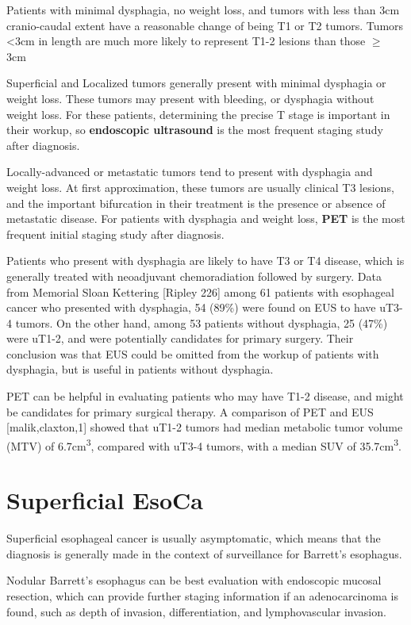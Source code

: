 \documentclass[
]{book}
\begin{document}
Patients with minimal dysphagia, no weight loss, and tumors with less than 3cm cranio-caudal extent have a reasonable change of being T1 or T2 tumors. Tumors \textless3cm in length are much more likely to represent T1-2 lesions than those \(\geq\) 3cm\citep{hollis1114}

Superficial and Localized tumors generally present with minimal dysphagia or weight loss. These tumors may present with bleeding, or dysphagia without weight loss. For these patients, determining the precise T stage is important in their workup, so \textbf{endoscopic ultrasound} is the most frequent staging study after diagnosis.

Locally-advanced or metastatic tumors tend to present with dysphagia and weight loss. At first approximation, these tumors are usually clinical T3 lesions, and the important bifurcation in their treatment is the presence or absence of metastatic disease. For patients with dysphagia and weight loss, \textbf{PET} is the most frequent initial staging study after diagnosis.

Patients who present with dysphagia are likely to have T3 or T4 disease, which is generally treated with neoadjuvant chemoradiation followed by surgery. Data from Memorial Sloan Kettering {[}Ripley 226{]} among 61 patients with esophageal cancer who presented with dysphagia, 54 (89\%) were found on EUS to have uT3-4 tumors. On the other hand, among 53 patients without dysphagia, 25 (47\%) were uT1-2, and were potentially candidates for primary surgery. Their conclusion was that EUS could be omitted from the workup of patients with dysphagia, but is useful in patients without dysphagia.

PET can be helpful in evaluating patients who may have T1-2 disease, and might be candidates for primary surgical therapy. A comparison of PET and EUS {[}malik,claxton,1{]} showed that uT1-2 tumors had median metabolic tumor volume (MTV) of 6.7cm\textsuperscript{3}, compared with uT3-4 tumors, with a median SUV of 35.7cm\textsuperscript{3}.

\hypertarget{superficial}{%
\chapter{Superficial EsoCa}\label{superficial}}

Superficial esophageal cancer is usually asymptomatic, which means that the diagnosis is generally made in the context of surveillance for Barrett's esophagus.

Nodular Barrett's esophagus can be best evaluation with endoscopic mucosal resection, which can provide further staging information if an adenocarcinoma is found, such as depth of invasion, differentiation, and lymphovascular invasion.
\end{document}
